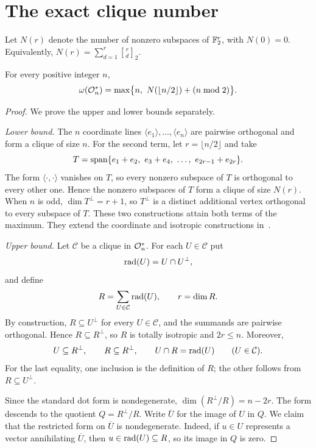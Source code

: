 \section{The exact clique number}
\label{sec:clique}

Let \(N(r)\) denote the number of nonzero subspaces of \(\mathbb F_2^r\), with
\(N(0)=0\).  Equivalently,
\(N(r)=\sum_{d=1}^r \genfrac{[}{]}{0pt}{}{r}{d}_2\).

\begin{theorem}\label{thm:clique}
For every positive integer \(n\),
\[
\omega(\mathcal O_n^*)=\max\bigl\{n,\ N(\lfloor n/2\rfloor)+(n\bmod 2)\bigr\} .
\]
\end{theorem}

\begin{proof}
We prove the upper and lower bounds separately.

\emph{Lower bound.}  The \(n\) coordinate lines
\(\langle e_1\rangle,\dots,\langle e_n\rangle\) are pairwise
orthogonal and form a clique of size \(n\).  For the second term, let
\(r=\lfloor n/2\rfloor\) and take
\[
T=\Span\{e_1+e_2,\ e_3+e_4,\ \dots,\ e_{2r-1}+e_{2r}\} .
\]
The form \(\langle\cdot,\cdot\rangle\) vanishes on \(T\), so every
nonzero subspace of \(T\) is orthogonal to every other one.  Hence the
nonzero subspaces of \(T\) form a clique of size \(N(r)\).  When \(n\)
is odd, \(\dim T^\perp=r+1\), so \(T^\perp\) is a distinct additional
vertex orthogonal to every subspace of \(T\).  These two
constructions attain both terms of the maximum.  They extend the coordinate
and isotropic constructions in~\cite[Sections~3--4]{Nikandish2026}.

\emph{Upper bound.}  Let \(\mathcal C\) be a clique in \(\mathcal O_n^*\).
For each \(U\in\mathcal C\) put
\[
\operatorname{rad}(U)=U\cap U^\perp ,
\]
and define
\[
R=\sum_{U\in\mathcal C}\operatorname{rad}(U),\qquad r=\dim R .
\]
By construction, \(R\subseteq U^\perp\) for every \(U\in\mathcal C\),
and the summands are pairwise orthogonal.  Hence \(R\subseteq R^\perp\),
so \(R\) is totally isotropic and \(2r\le n\).  Moreover,
\[
U\subseteq R^\perp,\qquad R\subseteq R^\perp,\qquad
U\cap R=\operatorname{rad}(U)\qquad(U\in\mathcal C).
\]
For the last equality, one inclusion is the definition of \(R\); the
other follows from \(R\subseteq U^\perp\).

Since the standard dot form is nondegenerate, \(\dim(R^\perp/R)=n-2r\).  The form
descends to the quotient \(Q=R^\perp/R\).  Write \(\overline U\) for
the image of \(U\) in \(Q\).  We claim that the restricted form on
\(\overline U\) is nondegenerate.  Indeed, if \(u\in U\) represents a
vector annihilating \(\overline U\), then \(u\in\operatorname{rad}(U)\subseteq R\),
so its image in \(Q\) is zero.


\end{proof}
